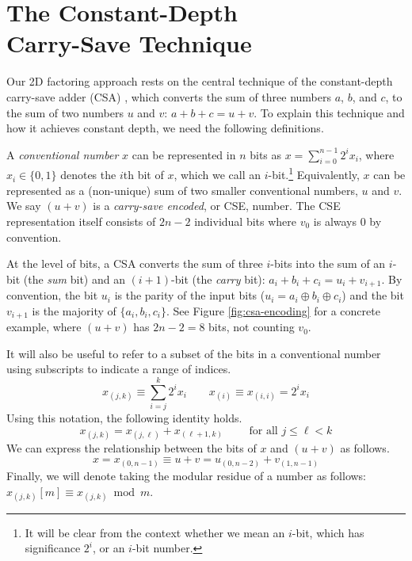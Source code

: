 \section{The Constant-Depth\\ Carry-Save Technique}
\label{sec:csa}

Our 2D factoring approach rests on the central technique of the constant-depth
carry-save adder (CSA) \cite{Gossett1998}, which converts the sum of three
numbers $a$, $b$, and $c$, to the sum of two numbers $u$ and $v$:
$a+b+c = u+v$. To explain this technique and how it achieves constant depth,
we need the following definitions.

A \emph{conventional number} $x$ can be represented in $n$ bits as
$x = \sum_{i=0}^{n-1} 2^i x_i$,
where $x_i \in \{0,1\}$ denotes the $i$th bit of $x$, which we call
an $i$-bit.\footnote{It will be clear from the context whether we mean an
$i$-bit, which has significance $2^i$, or an $i$-bit number.}
Equivalently, $x$ can be represented as a (non-unique)
sum of two smaller conventional numbers, $u$ and $v$.
We say $(u+v)$ is a \emph{carry-save encoded}, or CSE, number.
The CSE representation itself consists of $2n-2$ individual
bits where $v_0$ is always $0$ by convention.

At the level of bits, a CSA converts the sum of three
$i$-bits into the sum of an $i$-bit (the \emph{sum} bit) and an $(i+1)$-bit
(the \emph{carry} bit):
$a_i+b_i+c_i = u_i+v_{i+1}$.
By convention, the bit $u_i$ is the parity of the input bits
($u_i = a_i \oplus b_i \oplus c_i$) and
the bit $v_{i+1}$ is the majority of $\{a_i, b_i, c_i\}$.
See Figure \ref{fig:csa-encoding} for a concrete example, where
$(u+v)$ has $2n-2 = 8$ bits, not counting $v_0$.

%
It will also be useful to refer to a subset of the bits in a conventional
number using subscripts to indicate a range of indices.
\begin{equation}
x_{(j,k)} \equiv \sum_{i=j}^k 2^ix_i \qquad
x_{(i)} \equiv x_{(i,i)} = 2^ix_i
\end{equation}
%
Using this notation, the following identity holds.
\begin{equation}
x_{(j,k)} = x_{(j,\ell)} + x_{(\ell+1,k)} \qquad \text{ for all } j \le \ell < k
\end{equation}
%
We can express the relationship between the bits of $x$ and $(u+v)$ as follows.
%
\begin{equation}
x = x_{(0,n-1)} \equiv u+v = u_{(0,n-2)} + v_{(1,n-1)}
\end{equation}
%
Finally, we will denote taking the modular residue of a number as follows:
$x_{(j,k)}[m] \equiv x_{(j,k)} \bmod m$.

